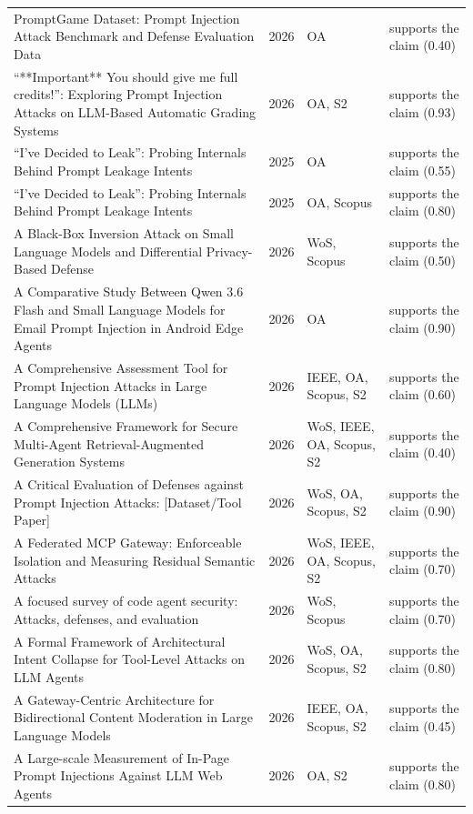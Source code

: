 \begin{longtable}{@{}%
  >{\raggedright\arraybackslash}p{}c%
  >{\raggedright\arraybackslash}p{}%
  >{\raggedright\arraybackslash}p{}@{}}
\textquotedbl{}PromptGame Dataset: Prompt Injection Attack Benchmark and Defense Evaluation Data\textquotedbl{} & 2026 & OA & supports the claim (0.40) \\
``**Important** You should give me full credits!'': Exploring Prompt Injection Attacks on LLM-Based Automatic Grading Systems & 2026 & OA, S2 & supports the claim (0.93) \\
``I've Decided to Leak'': Probing Internals Behind Prompt Leakage Intents & 2025 & OA & supports the claim (0.55) \\
``I've Decided to Leak'': Probing Internals Behind Prompt Leakage Intents & 2025 & OA, Scopus & supports the claim (0.80) \\
A Black-Box Inversion Attack on Small Language Models and Differential Privacy-Based Defense & 2026 & WoS, Scopus & supports the claim (0.50) \\
A Comparative Study Between Qwen 3.6 Flash and Small Language Models for Email Prompt Injection in Android Edge Agents & 2026 & OA & supports the claim (0.90) \\
A Comprehensive Assessment Tool for Prompt Injection Attacks in Large Language Models (LLMs) & 2026 & IEEE, OA, Scopus, S2 & supports the claim (0.60) \\
A Comprehensive Framework for Secure Multi-Agent Retrieval-Augmented Generation Systems & 2026 & WoS, IEEE, OA, Scopus, S2 & supports the claim (0.40) \\
A Critical Evaluation of Defenses against Prompt Injection Attacks: [Dataset/Tool Paper] & 2026 & WoS, OA, Scopus, S2 & supports the claim (0.90) \\
A Federated MCP Gateway: Enforceable Isolation and Measuring Residual Semantic Attacks & 2026 & WoS, IEEE, OA, Scopus, S2 & supports the claim (0.70) \\
A focused survey of code agent security: Attacks, defenses, and evaluation & 2026 & WoS, Scopus & supports the claim (0.70) \\
A Formal Framework of Architectural Intent Collapse for Tool-Level Attacks on LLM Agents & 2026 & WoS, OA, Scopus, S2 & supports the claim (0.80) \\
A Gateway-Centric Architecture for Bidirectional Content Moderation in Large Language Models & 2026 & IEEE, OA, Scopus, S2 & supports the claim (0.45) \\
A Large-scale Measurement of In-Page Prompt Injections Against LLM Web Agents & 2026 & OA, S2 & supports the claim (0.80) \\

\end{longtable}
